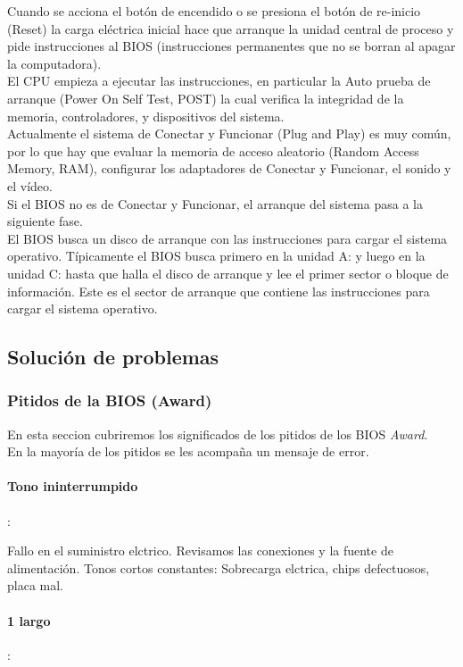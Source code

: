 \documentclass[12pt,oneside,a4paper]{article}
\begin{document}
	Cuando se acciona el botón de encendido o se presiona el botón de re-inicio
	(Reset) la carga eléctrica inicial hace que arranque la unidad central de
	proceso y pide instrucciones al BIOS (instrucciones permanentes que no se
	borran al apagar la computadora). \\ 
	El CPU empieza a ejecutar las instrucciones, en particular la Auto prueba
	de arranque (Power On Self Test, POST) la cual verifica la integridad de la
	memoria, controladores, y dispositivos del sistema. \\ 
	Actualmente el sistema de Conectar y Funcionar (Plug and Play) es muy
	común, por lo que hay que evaluar la memoria de acceso aleatorio (Random
	Access Memory, RAM), configurar los adaptadores de Conectar y Funcionar, el 
	sonido y el vídeo. \\ 
	Si el BIOS no es de Conectar y Funcionar, el arranque del sistema pasa a la
	siguiente fase. \\ 
	El BIOS busca un disco de arranque con las instrucciones para cargar el
	sistema operativo.  Típicamente el BIOS busca primero en la unidad A: y
	luego en la unidad C: hasta que halla el disco de arranque y lee el primer
	sector o bloque de información. Este es el sector de arranque que contiene
	las instrucciones para cargar el sistema operativo.

	\subsection{Solución de problemas}{\label{sec:bios/solucion-de-problemas}}
		\subsubsection{Pitidos de la BIOS (Award)}{\label{sec:bios/tonos-de-la-bios}}

		En esta seccion cubriremos los significados de los pitidos de los BIOS {\em Award}. \\
		En la mayoría de los pitidos se les acompaña un mensaje de error. 

			\paragraph{Tono ininterrumpido}:
			
			Fallo en el suministro elctrico. Revisamos las conexiones y la fuente
			de alimentación.  Tonos cortos constantes: Sobrecarga elctrica, chips
			defectuosos, placa mal.

			\paragraph{1 largo}:
\end{document}
